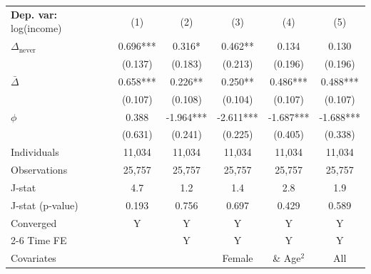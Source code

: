 \begin{tabular}{l ccccc} \toprule  \textbf{Dep. var:}  log(income) 
                    &\multicolumn{1}{c}{(1)}   &\multicolumn{1}{c}{(2)}   &\multicolumn{1}{c}{(3)}   &\multicolumn{1}{c}{(4)}   &\multicolumn{1}{c}{(5)}   \\

\addlinespace
$\Delta_{\text{never}}$&       0.696***&       0.316*  &       0.462** &       0.134   &       0.130   \\
                    &     (0.137)   &     (0.183)   &     (0.213)   &     (0.196)   &     (0.196)   \\

\addlinespace
$\bar{\Delta}$      &       0.658***&       0.226** &       0.250** &       0.486***&       0.488***\\
                    &     (0.107)   &     (0.108)   &     (0.104)   &     (0.107)   &     (0.107)   \\

\addlinespace
$\phi$              &       0.388   &      -1.964***&      -2.611***&      -1.687***&      -1.688***\\
                    &     (0.631)   &     (0.241)   &     (0.225)   &     (0.405)   &     (0.338)   \\
\addlinespace
Individuals         &      11,034   &      11,034   &      11,034   &      11,034   &      11,034   \\
Observations        &      25,757   &      25,757   &      25,757   &      25,757   &      25,757   \\
J-stat              &         4.7   &         1.2   &         1.4   &         2.8   &         1.9   \\
J-stat (p-value)    &       0.193   &       0.756   &       0.697   &       0.429   &       0.589   \\
Converged           &           Y   &           Y   &           Y   &           Y   &           Y   \\
\cmidrule{2-6} Time FE & & Y & Y & Y & Y \\ Covariates & & & Female & \& Age$^2$ & All \\ \bottomrule \end{tabular}
